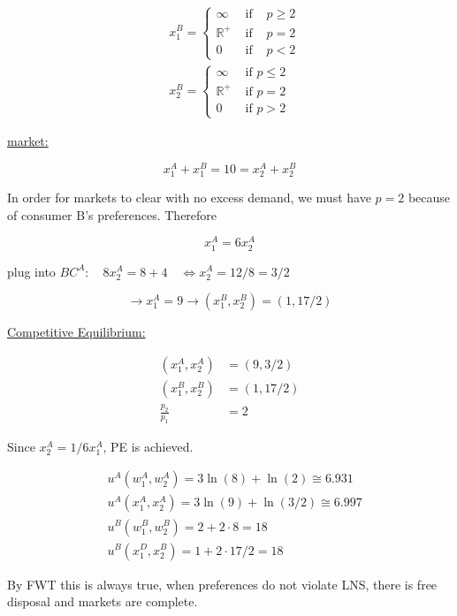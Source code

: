 {{\begin{enumerate}[label=(\roman*)]
{$$
\begin{aligned}
& x_{1}^{B}=\left\{\begin{array}{lll}
\infty & \text { if } & p \geq 2 \\
\mathbb{R}^{+} & \text { if } & p=2 \\
0 & \text { if } & p<2
\end{array}\right. \\
& x_{2}^{B}=\left\{\begin{array}{lll}
\infty & \text { if } p \leq 2 \\
\mathbb{R}^{+} & \text { if } p=2 \\
0 & \text { if } p>2
\end{array}\right.
\end{aligned}
$$

\underline{market:} 

$$
x_{1}^{A}+x_{1}^{B}=10=x_{2}^{A}+x_{2}^{B}
$$

In order for markets to clear with no excess demand, we must have $p=2$ because of consumer B's preferences.
Therefore

$$
x_{1}^{A}=6 x_{2}^{A}
$$

plug into $B C^{A}: \quad 8 x_{2}^{A}=8+4 \quad \Longleftrightarrow x_{2}^{A}=12 / 8=3 / 2$

$$
\rightarrow x_{1}^{A}=9 \rightarrow\left(x_{1}^{B}, x_{2}^{B}\right)=(1,17 / 2)
$$

\underline{Competitive Equilibrium:}

\begin{align*}
    \left(x_{1}^{A}, x_{2}^{A}\right) &= (9,3 / 2) \\
    \left(x_{1}^{B}, x_{2}^{B}\right) &= (1,17 / 2) \\
    \frac{p_2}{p_1} &= 2
\end{align*}

Since $x_{2}^{A}=1 / 6 x_{1}^{A}$, PE is achieved.
}
{
\item 

$$
\begin{aligned}
& u^{A}\left(w_{1}^{A}, w_{2}^{A}\right)=3 \ln (8)+\ln (2) \cong 6.931 \\
& u^{A}\left(x_{1}^{A}, x_{2}^{A}\right)=3 \ln (9)+\ln (3 / 2) \cong 6.997 \\
& u^{B}\left(w_{1}^{B}, w_{2}^{B}\right)=2+2 \cdot 8=18 \\
& u^{B}\left(x_{1}^{D}, x_{2}^{B}\right)=1+2 \cdot 17 / 2=18
\end{aligned}
$$

By FWT this is always true, when preferences do not violate LNS, there is free disposal and markets are complete.
}
\end{enumerate}
}
{
}}
